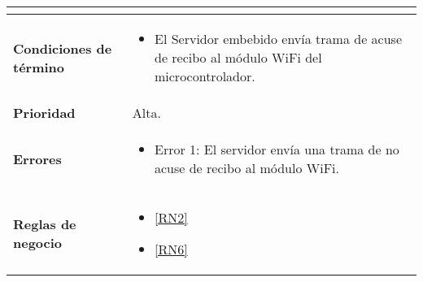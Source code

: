 \begin{longtable}{|J{5cm}|J{10.3cm}|}
\begin{itemize}
		\end{itemize} \\ \hline
	\textbf{Condiciones de término} & 
		\begin{itemize}
		    \item El Servidor embebido envía trama de acuse de recibo al módulo WiFi del microcontrolador.
		\end{itemize} 
		\\ \hline 
	\textbf{Prioridad} & 
		Alta. \\ \hline
	\textbf{Errores} &
		 \begin{itemize}
		 	\item \label{SUB-M-CU1.4:Error1} Error 1: El servidor envía una trama de no acuse de recibo al módulo WiFi.
		 \end{itemize} \\ 
		 \hline
	\textbf{Reglas de negocio} & 
	    \begin{itemize}
	      \item  \ref{RN2}
	      \item  \ref{RN6}
		 \end{itemize}%
		 \hline
\end{longtable}

